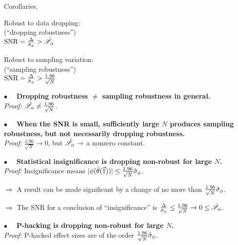 \begin{frame}[t]{Corollaries.}
%
\begin{minipage}{0.45\textwidth}
\begin{center}
    Robust to data dropping:\\
    (``dropping robustness'')\\
    \vspace{1em}
    $\textrm{SNR} = \frac{\Delta}{\hat\sigma_{\phi}} > \hat{\mathscr{S}}_\alpha$
\end{center}
\end{minipage}
%
\begin{minipage}{0.45\textwidth}
\begin{center}
    Robust to sampling variation:\\
    (``sampling robustness'')\\
    \vspace{1em}
    $\textrm{SNR} = \frac{\Delta}{\hat\sigma_{\phi}} >
        \frac{1.96}{\sqrt{N}}$
\end{center}
\end{minipage}

\vspace{1em}

\hrulefill

\vspace{0.5em} $\bullet\quad$
\textbf{Dropping robustness $\ne$ sampling robustness in general.\\}
\textit{Proof: }
$\hat{\mathscr{S}}_\alpha \ne \frac{1.96}{\sqrt{N}}$.

\vspace{0.5em} $\bullet\quad$
\textbf{When the SNR is small, sufficiently large $N$
produces sampling robustness, but not necessarily
dropping robustness.\\}
\textit{Proof: }
$\frac{1.96}{\sqrt{N}} \rightarrow 0$, but $\hat{\mathscr{S}}_\alpha \rightarrow$ a nonzero
constant.

\vspace{0.5em} $\bullet\quad$
\textbf{Statistical insignificance is dropping non-robust for large $N$.\\}
\textit{Proof: }
%
Insignificance means
$|\phi(\hat{\theta}(\vec{1}))| \le \frac{1.96}{\sqrt{N}} \hat\sigma_{\phi}$.

$\Rightarrow$ A result can be made significant by a change of no more than
$\frac{1.96}{\sqrt{N}} \hat\sigma_{\phi}$.

$\Rightarrow$ The SNR for a conclusion
of ``insignificance'' is $\frac{\Delta}{\hat\sigma_{\phi}} \le \frac{1.96}{\sqrt{N}}
\rightarrow 0 \le \hat{\mathscr{S}}_\alpha$.

\vspace{0.5em} $\bullet\quad$
\textbf{P-hacking is dropping non-robust for large $N$.\\}
\textit{Proof: }P-hacked effect sizes are of the order
$\frac{1.96}{\sqrt{N}} \hat\sigma_{\phi}$.

\end{frame}




